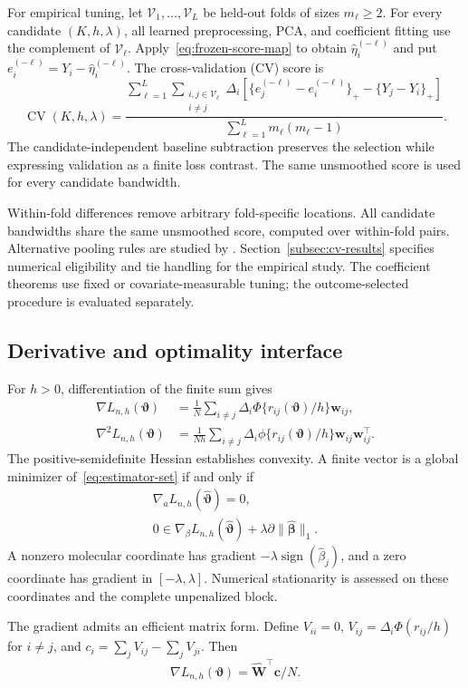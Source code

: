 For empirical tuning, let $\mathcal V_1,\ldots,\mathcal V_L$ be held-out folds of sizes $m_\ell\ge2$. For every candidate $(K,h,\lambda)$, all learned preprocessing, PCA, and coefficient fitting use the complement of $\mathcal V_\ell$. Apply~\eqref{eq:frozen-score-map} to obtain $\widehat\eta_i^{(-\ell)}$ and put $e_i^{(-\ell)}=Y_i-\widehat\eta_i^{(-\ell)}$. The cross-validation (CV) score is
\begin{equation}
 \operatorname{CV}(K,h,\lambda)=
 \frac{\displaystyle\sum_{\ell=1}^L
       \sum_{\substack{i,j\in\mathcal V_\ell\\ i\ne j}}
       \Delta_i\left[\{e_j^{(-\ell)}-e_i^{(-\ell)}\}_+
                       -\{Y_j-Y_i\}_+\right]}
      {\displaystyle\sum_{\ell=1}^Lm_\ell(m_\ell-1)}.
 \label{eq:within-fold-cv}
\end{equation}
The candidate-independent baseline subtraction preserves the selection while expressing validation as a finite loss contrast. The same unsmoothed score is used for every candidate bandwidth.

Within-fold differences remove arbitrary fold-specific locations. All candidate bandwidths share the same unsmoothed score, computed over within-fold pairs. Alternative pooling rules are studied by \citet{SuderMolstad2022}. Section~\ref{subsec:cv-results} specifies numerical eligibility and tie handling for the empirical study. The coefficient theorems use fixed or covariate-measurable tuning; the outcome-selected procedure is evaluated separately.

\subsection{Derivative and optimality interface}
\label{subsec:optimality-interface}
For $h>0$, differentiation of the finite sum gives
\begin{equation}
 \begin{aligned}
 \nabla L_{n,h}(\bm{\vartheta})
 &=\frac1N\sum_{i\ne j}\Delta_i\Phi\{r_{ij}(\bm{\vartheta})/h\}\bm{w}_{ij},\\
 \nabla^2L_{n,h}(\bm{\vartheta})
 &=\frac1{Nh}\sum_{i\ne j}\Delta_i\phi\{r_{ij}(\bm{\vartheta})/h\}\bm{w}_{ij}\bm{w}_{ij}^\top.
 \end{aligned}
 \label{eq:loss-derivatives}
\end{equation}
The positive-semidefinite Hessian establishes convexity. A finite vector is a global minimizer of~\eqref{eq:estimator-set} if and only if
\begin{equation}
 \begin{gathered}
\nabla_aL_{n,h}(\widehat{\bm{\vartheta}})=0,\\
 0\in\nabla_\beta L_{n,h}(\widehat{\bm{\vartheta}})
          +\lambda\partial\|\widehat{\bm{\beta}}\|_1.
 \end{gathered}
 \label{eq:kkt-interface}
\end{equation}
A nonzero molecular coordinate has gradient $-\lambda\operatorname{sign}(\widehat\beta_j)$, and a zero coordinate has gradient in $[-\lambda,\lambda]$. Numerical stationarity is assessed on these coordinates and the complete unpenalized block.

The gradient admits an efficient matrix form. Define $V_{ii}=0$, $V_{ij}=\Delta_i\Phi(r_{ij}/h)$ for $i\ne j$, and $c_i=\sum_jV_{ij}-\sum_jV_{ji}$. Then
\begin{equation}
 \nabla L_{n,h}(\bm{\vartheta})=\widehat{\bm{W}}^\top \bm{c}/N.
 \label{eq:matrix-gradient}
\end{equation}
